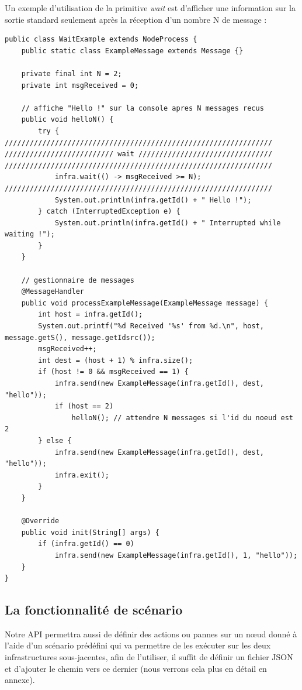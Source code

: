 \documentclass{article}
\begin{document}
					Un exemple d'utilisation de la primitive \emph{wait} est d'afficher une information sur la sortie standard seulement
					après la réception d'un nombre N de message :
					\newpage
					\begin{lstlisting}
public class WaitExample extends NodeProcess {
	public static class ExampleMessage extends Message {}

	private final int N = 2;
	private int msgReceived = 0;

	// affiche "Hello !" sur la console apres N messages recus
	public void helloN() {
		try {
////////////////////////////////////////////////////////////////
////////////////////////// wait ////////////////////////////////
////////////////////////////////////////////////////////////////
			infra.wait(() -> msgReceived >= N);
////////////////////////////////////////////////////////////////
			System.out.println(infra.getId() + " Hello !");
		} catch (InterruptedException e) {
			System.out.println(infra.getId() + " Interrupted while waiting !");
		}
	}

	// gestionnaire de messages
	@MessageHandler
	public void processExampleMessage(ExampleMessage message) {
		int host = infra.getId();
		System.out.printf("%d Received '%s' from %d.\n", host, message.getS(), message.getIdsrc());
		msgReceived++;
		int dest = (host + 1) % infra.size();
		if (host != 0 && msgReceived == 1) {
			infra.send(new ExampleMessage(infra.getId(), dest, "hello"));
			if (host == 2)
				helloN(); // attendre N messages si l'id du noeud est 2
		} else {
			infra.send(new ExampleMessage(infra.getId(), dest, "hello"));
			infra.exit();
		}
	}

	@Override
	public void init(String[] args) {
		if (infra.getId() == 0)
			infra.send(new ExampleMessage(infra.getId(), 1, "hello"));
	}
}
					\end{lstlisting}
					\newpage
							\subsection{La fonctionnalité de scénario}
							Notre API permettra aussi de définir des actions ou pannes sur un nœud donné à l'aide d'un scénario prédéfini qui va permettre de les exécuter sur les deux infrastructures sous-jacentes,
							afin de l'utiliser, il suffit de définir un fichier JSON et d'ajouter le chemin vers ce dernier (nous verrons cela plus en détail en annexe).
							
\end{document}
